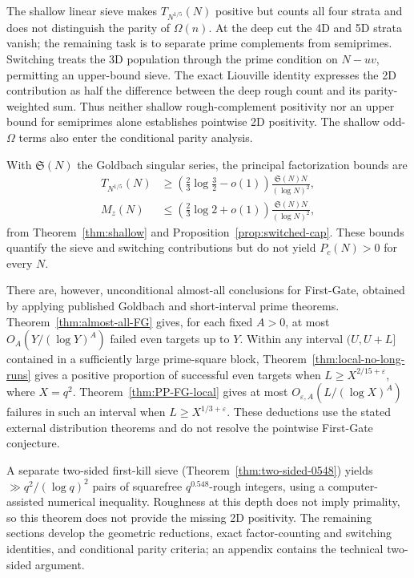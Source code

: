 \documentclass[final,11pt]{elsarticle}
\theoremstyle{definition}
\theoremstyle{remark}
\numberwithin{equation}{section}
\begin{document}
The shallow linear sieve makes $T_{N^{1/5}}(N)$ positive but counts all four strata and does not distinguish the parity of $\Omega(n)$. At the deep cut the 4D and 5D strata vanish; the remaining task is to separate prime complements from semiprimes. Switching treats the 3D population through the prime condition on $N-uv$, permitting an upper-bound sieve. The exact Liouville identity expresses the 2D contribution as half the difference between the deep rough count and its parity-weighted sum. Thus neither shallow rough-complement positivity nor an upper bound for semiprimes alone establishes pointwise 2D positivity. The shallow odd-$\Omega$ terms also enter the conditional parity analysis.

With $\mathfrak S(N)$ the Goldbach singular series, the principal factorization bounds are
\begin{align*}
T_{N^{1/5}}(N)&\ge\left(\frac23\log\frac32-o(1)\right)
 \frac{\mathfrak S(N)N}{(\log N)^2},\\
M_z(N)&\le\left(\frac23\log2+o(1)\right)
 \frac{\mathfrak S(N)N}{(\log N)^2},
\end{align*}
from Theorem~\ref{thm:shallow} and Proposition~\ref{prop:switched-cap}. These bounds quantify the sieve and switching contributions but do not yield $P_c(N)>0$ for every $N$.

There are, however, unconditional almost-all conclusions for First-Gate, obtained by applying published Goldbach and short-interval prime theorems. Theorem~\ref{thm:almost-all-FG} gives, for each fixed $A>0$, at most $O_A(Y/(\log Y)^A)$ failed even targets up to $Y$. Within any interval $(U,U+L]$ contained in a sufficiently large prime-square block, Theorem~\ref{thm:local-no-long-runs} gives a positive proportion of successful even targets when $L\ge X^{2/15+\varepsilon}$, where $X=q^2$. Theorem~\ref{thm:PP-FG-local} gives at most $O_{\varepsilon,A}(L/(\log X)^A)$ failures in such an interval when $L\ge X^{1/3+\varepsilon}$. These deductions use the stated external distribution theorems and do not resolve the pointwise First-Gate conjecture.

A separate two-sided first-kill sieve (Theorem~\ref{thm:two-sided-0548}) yields $\gg q^2/(\log q)^2$ pairs of squarefree $q^{0.548}$-rough integers, using a computer-assisted numerical inequality. Roughness at this depth does not imply primality, so this theorem does not provide the missing 2D positivity. The remaining sections develop the geometric reductions, exact factor-counting and switching identities, and conditional parity criteria; an appendix contains the technical two-sided argument.
\end{document}
